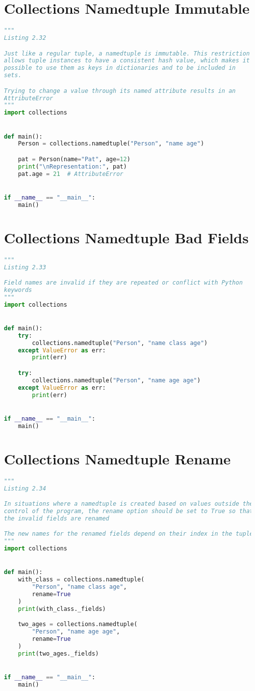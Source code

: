 \documentclass[a4paper,landscape]{report}
\begin{document}
\section{Collections Namedtuple Immutable}
\begin{lstlisting}[language=Python]
"""
Listing 2.32

Just like a regular tuple, a namedtuple is immutable. This restriction
allows tuple instances to have a consistent hash value, which makes it
possible to use them as keys in dictionaries and to be included in
sets.

Trying to change a value through its named attribute results in an
AttributeError
"""
import collections


def main():
    Person = collections.namedtuple("Person", "name age")

    pat = Person(name="Pat", age=12)
    print("\nRepresentation:", pat)
    pat.age = 21  # AttributeError


if __name__ == "__main__":
    main()

\end{lstlisting}
\section{Collections Namedtuple Bad Fields}
\begin{lstlisting}[language=Python]
"""
Listing 2.33

Field names are invalid if they are repeated or conflict with Python
keywords
"""
import collections


def main():
    try:
        collections.namedtuple("Person", "name class age")
    except ValueError as err:
        print(err)

    try:
        collections.namedtuple("Person", "name age age")
    except ValueError as err:
        print(err)


if __name__ == "__main__":
    main()

\end{lstlisting}
\section{Collections Namedtuple Rename}
\begin{lstlisting}[language=Python]
"""
Listing 2.34

In situations where a namedtuple is created based on values outside the
control of the program, the rename option should be set to True so that
the invalid fields are renamed

The new names for the renamed fields depend on their index in the tuple
"""
import collections


def main():
    with_class = collections.namedtuple(
        "Person", "name class age",
        rename=True
    )
    print(with_class._fields)

    two_ages = collections.namedtuple(
        "Person", "name age age",
        rename=True
    )
    print(two_ages._fields)


if __name__ == "__main__":
    main()

\end{lstlisting}
\end{document}
